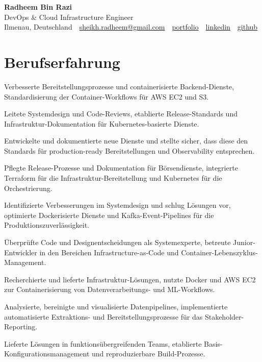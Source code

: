 \documentclass[11pt,a4paper]{resume}
\makeatletter
\newcommand{\Portfolio}{https://radheem.github.io/my-cv}
\newcommand{\PortfolioText}{portfolio}
\newcommand{\GitHub}{https://github.com/radheem}
\newcommand{\LinkedIn}{https://www.linkedin.com/in/radheem-razi}
\newcommand{\Email}{sheikh.radheem@gmail.com}
\makeatother
\begin{document}
\clearpage
{}

\begin{center}
  {\huge\bfseries Radheem Bin Razi}\\[3pt]
  {\large DevOps \& Cloud Infrastructure Engineer}\\[6pt]
  \small
  Ilmenau, Deutschland \,\textbar\,
  \href{mailto:\Email}{\Email} \,\textbar\,
  \href{\Portfolio}{\PortfolioText} \,\textbar\,
  \href{\LinkedIn}{linkedin} \,\textbar\,
  \href{\GitHub}{github}
\end{center}
\vspace{2pt}

\section{Berufserfahrung}

\bullets
  \item Verbesserte Bereitstellungsprozesse und containerisierte Backend-Dienste, Standardisierung der Container-Workflows für AWS EC2 und S3.
  \item Leitete Systemdesign und Code-Reviews, etablierte Release-Standards und Infrastruktur-Dokumentation für Kubernetes-basierte Dienste.
  \item Entwickelte und dokumentierte neue Dienste und stellte sicher, dass diese den Standards für production-ready Bereitstellungen und Observability entsprechen.
\bulletsend
\vspace{3pt}
\bullets
  \item Pflegte Release-Prozesse und Dokumentation für Börsendienste, integrierte Terraform für die Infrastruktur-Bereitstellung und Kubernetes für die Orchestrierung.
  \item Identifizierte Verbesserungen im Systemdesign und schlug Lösungen vor, optimierte Dockerisierte Dienste und Kafka-Event-Pipelines für die Produktionszuverlässigkeit.
  \item Überprüfte Code und Designentscheidungen als Systemexperte, betreute Junior-Entwickler in den Bereichen Infrastructure-as-Code und Container-Lebenszyklus-Management.
\bulletsend
\vspace{3pt}
\bullets
  \item Recherchierte und lieferte Infrastruktur-Lösungen, nutzte Docker und AWS EC2 zur Containerisierung von Datenverarbeitungs- und ML-Workflows.
  \item Analysierte, bereinigte und visualisierte Datenpipelines, implementierte automatisierte Extraktions- und Bereitstellungsprozesse für das Stakeholder-Reporting.
  \item Lieferte Lösungen in funktionsübergreifenden Teams, etablierte Basis-Konfigurationsmanagement und reproduzierbare Build-Prozesse.
\bulletsend
\vspace{3pt}
\end{document}
